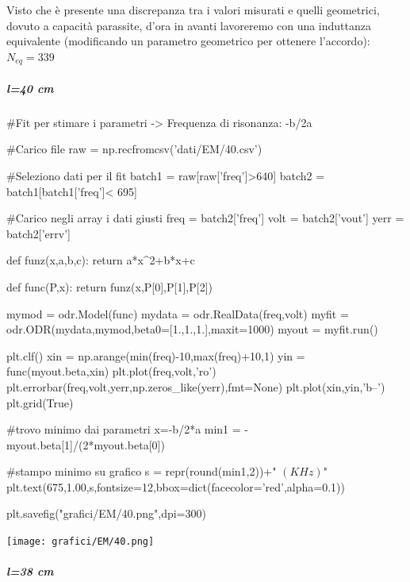 Visto che è presente una discrepanza tra i valori misurati e quelli geometrici, dovuto a capacità parassite, d'ora in avanti lavoreremo con una induttanza equivalente (modificando un parametro geometrico per ottenere l'accordo): $N_{eq} = 339$

\subparagraph*{l=40 cm}

\begin{sagesilent}

 #Fit per stimare i parametri -> Frequenza di risonanza: -b/2a

#Carico file
raw = np.recfromcsv('dati/EM/40.csv')

#Seleziono dati per il fit
batch1 = raw[raw['freq']>640]
batch2 = batch1[batch1['freq']< 695]

#Carico negli array i dati giusti
freq = batch2['freq']
volt = batch2['vout']
yerr = batch2['errv']


def funz(x,a,b,c):
    return a*x^2+b*x+c

def func(P,x):
    return funz(x,P[0],P[1],P[2])

mymod = odr.Model(func)
mydata = odr.RealData(freq,volt)
myfit = odr.ODR(mydata,mymod,beta0=[1.,1.,1.],maxit=1000)
myout = myfit.run()

plt.clf()
xin = np.arange(min(freq)-10,max(freq)+10,1)
yin = func(myout.beta,xin)
plt.plot(freq,volt,'ro')
plt.errorbar(freq,volt,yerr,np.zeros_like(yerr),fmt=None)
plt.plot(xin,yin,'b--')
plt.grid(True)

#trovo minimo dai parametri x=-b/2*a
min1 = -myout.beta[1]/(2*myout.beta[0]) 

#stampo minimo su grafico
s = repr(round(min1,2))+" $(KHz)$"
plt.text(675,1.00,s,fontsize=12,bbox=dict(facecolor='red',alpha=0.1))

plt.savefig("grafici/EM/40.png",dpi=300)
 
\end{sagesilent}

\texttt{[image: grafici/EM/40.png]}




\subparagraph*{l=38 cm}

